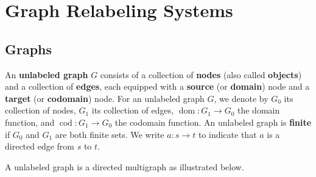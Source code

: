 
\chapter{Graph Relabeling Systems}
    \label{sec:gls}
    \section{Graphs}
    \label{sec:graphs}
    \begin{definition}
        \label{def:graph:unlabeled}
        An \textbf{unlabeled graph} \( G \) consists of a collection of \textbf{nodes} (also called \textbf{objects}) and a collection of \textbf{edges}, each equipped with a \textbf{source} (or \textbf{domain}) node and a \textbf{target} (or \textbf{codomain}) node. 
        For an unlabeled graph \( G \), we denote by \( G_0 \) its collection of nodes, \( G_1 \) its collection of edges, \( \operatorname{dom}:G_1{\to}G_0 \) the domain function, and \( \operatorname{cod}:G_1{\to}G_0 \) the codomain function. An unlabeled graph is \textbf{finite} if \( G_0 \) and \( G_1 \) are both finite sets.
        We write \( a: s \mathop{\to} t \) to indicate that \( a \) is a directed edge from \( s \) to \( t \). 
    \end{definition}   
    \begin{example}
      A unlabeled graph is a directed multigraph as illustrated below.
       
        \begin{center}
      \end{center} 
    \end{example}

